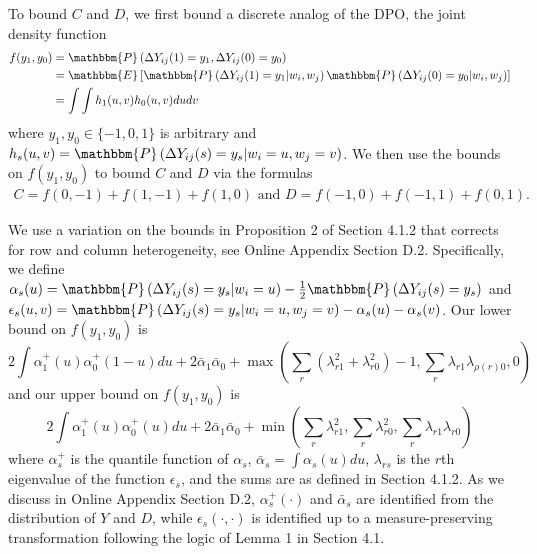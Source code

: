 \documentclass[12pt]{article}
\theoremstyle{definition}
\begin{document}
To bound $C$ and $D$, we first bound a discrete analog of the DPO, the joint density function 
\begin{align*}
f(y_1,y_0) &= \mathbbm{P}\left( \Delta Y_{ij}(1) = y_1, \Delta Y_{ij}(0) = y_0\right) \\
&= \mathbbm{E}\left[ \mathbbm{P}\left(\Delta Y_{ij}(1) = y_1 | w_{i}, w_{j}\right) \mathbbm{P}\left(\Delta Y_{ij}(0) = y_0 | w_{i}, w_{j}\right)\right] \\
&= \int\int h_{1}(u,v)h_{0}(u,v)dudv
\end{align*}
where $y_1, y_0 \in \{-1,0,1\}$ is arbitrary and $h_{s}(u,v) = \mathbbm{P}\left(\Delta Y_{ij}(s) = y_s | w_i = u, w_j = v \right)$. We then use the bounds on $f(y_1,y_0)$ to bound $C$ and $D$ via the formulas
\begin{align*}
C = f(0,-1)+f(1,-1)+f(1,0) \text{ and }  
D = f(-1,0)+f(-1,1)+f(0,1). 
\end{align*}

We use a variation on the bounds in Proposition 2 of Section 4.1.2 that corrects for row and column heterogeneity, see Online Appendix Section D.2. Specifically, we define $\alpha_{s}(u) = \mathbbm{P}\left(\Delta Y_{ij}(s) = y_s | w_i = u\right) - \frac{1}{2}\mathbbm{P}\left(\Delta Y_{ij}(s) = y_s\right)$ and $\epsilon_s(u,v) = \mathbbm{P}\left(\Delta Y_{ij}(s) = y_s| w_i = u, w_j = v\right) - \alpha_{s}(u) - \alpha_{s}(v)$. Our lower bound on $f(y_1,y_0)$ is $$2\int\alpha_{1}^{+}(u)\alpha_{0}^{+}(1-u)du + 2\bar{\alpha}_{1}\bar{\alpha}_{0} + \max\left(\sum_{r}\left(\lambda_{r1}^{2} + \lambda_{r0}^{2}\right) - 1,\sum_{r}\lambda_{r1}\lambda_{\rho(r)0},0\right)$$ and our upper bound on $f(y_1,y_0)$ is $$2\int\alpha_{1}^{+}(u)\alpha_{0}^{+}(u)du + 2\bar{\alpha}_{1}\bar{\alpha}_{0} + \min\left(\sum_{r}\lambda_{r1}^{2},\sum_{r}\lambda_{r0}^{2},\sum_{r}\lambda_{r1}\lambda_{r0}\right)$$
where $\alpha_{s}^{+}$ is the quantile function of $\alpha_{s}$, $\bar{\alpha}_s = \int\alpha_s(u)du$,  $\lambda_{rs}$ is the $r$th eigenvalue of the function $\epsilon_s$, and the sums are as defined in Section 4.1.2. As we discuss in Online Appendix Section D.2, $\alpha^{+}_s(\cdot)$ and $\bar{\alpha}_s$ are identified from the distribution of $Y$ and $D$, while $\epsilon_s(\cdot,\cdot)$ is identified up to a measure-preserving transformation following the logic of Lemma 1 in Section 4.1.   
\end{document}
